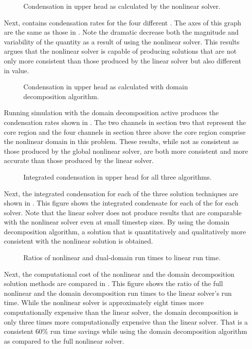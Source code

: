 \begin{figure}[h!tb]
\centering

\caption{Condensation in upper head as calculated by the nonlinear solver.}
\label{fig:refloodGammaNln}
\end{figure}

Next,  contains condensation rates for the four different \dtmax{}.
The axes of this graph are the same as those in .
Note the dramatic decrease both the magnitude and variability of the quantity as a result of using the nonlinear solver.
This results argues that the nonlinear solver is capable of producing solutions that are not only  more consistent than those produced by the linear solver but also different in value.

\begin{figure}[h!tb]
\centering

\caption{Condensation in upper head as calculated with domain decomposition algorithm.}
\label{fig:refloodGammaDom}
\end{figure}

Running simulation with the domain decomposition active produces the condensation rates shown in .
The two channels in section two that represent the core region and the four channels in section three above the core region comprise the nonlinear domain in this problem.
These results, while not as consistent as those produced by the global nonlinear solver, are both more consistent and more accurate than those produced by the linear solver.

\begin{figure}[t!hb]
\centering

\caption{Integrated condensation in upper head for all three algorithms.}
\label{fig:refloodMaxGamma}
\end{figure}

Next, the integrated condensation for each of the three solution techniques are shown in .
This figure shows the integrated condensate for each of the \dtmax{} for each solver.
Note that the linear solver does not produce results that are comparable with the nonlinear solver even at small timestep sizes.
By using the domain decomposition algorithm, a solution that is quantitatively and qualitatively more consistent with the nonlinear solution is obtained.

\begin{figure}[h!tb]
\centering

\caption{Ratios of nonlinear and dual-domain run times to linear run time.}
\label{fig:refloodRunTimeRatios}
\end{figure}

Next, the computational cost of the nonlinear and the domain decomposition solution methods are compared in .
This figure shows the ratio of the full nonlinear and the domain decomposition run times to the linear solver's run time.
While the nonlinear solver is approximately eight times more computationally expensive than the linear solver, the domain decomposition is only three times more computationally expensive than the linear solver.
That is a consistent 60\% run time savings while using the domain decomposition algorithm as compared to the full nonlinear solver.